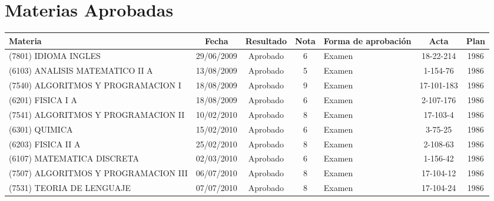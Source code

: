 
\chapter{Materias Aprobadas} %

\label{AppendixB} %


\begin{center}
    \scriptsize
    \centering
    \begin{longtable}{|p{3.5cm}|c|c|c|p{1.4cm}|c|c|}
        \hline 
        \bfseries Materia & \bfseries Fecha & \bfseries Resultado & 
        \bfseries Nota & \bfseries Forma de aprobación & \bfseries Acta & 
        \bfseries	Plan \\
        \hline
        (7801) IDIOMA INGLES & 29/06/2009 & Aprobado & 6 & Examen & 
        18-22-214 & 1986 \\
        \hline
        (6103) ANALISIS MATEMATICO II A & 13/08/2009 & Aprobado & 5 & Examen
        & 1-154-76 & 1986 \\
        \hline
        (7540) ALGORITMOS Y PROGRAMACION I & 18/08/2009 & Aprobado & 9 & 
        Examen & 17-101-183 & 1986 \\
        \hline
        (6201) FISICA I A & 18/08/2009 & Aprobado & 6 & Examen & 2-107-176 &
        1986 \\
        \hline
        (7541) ALGORITMOS Y PROGRAMACION II & 10/02/2010 & Aprobado & 8 & 
        Examen & 17-103-4 & 1986 \\
        \hline
        (6301) QUIMICA & 15/02/2010 & Aprobado & 6 & Examen & 3-75-25 & 1986
        \\
        \hline
        (6203) FISICA II A & 25/02/2010 & Aprobado & 8 & Examen & 2-108-63 &
        1986 \\
        \hline
        (6107) MATEMATICA DISCRETA & 02/03/2010 & Aprobado & 6 & Examen & 
        1-156-42 & 1986 \\
        \hline
        (7507) ALGORITMOS Y PROGRAMACION III & 06/07/2010 & Aprobado & 8 & 
        Examen & 17-104-12 & 1986 \\
        \hline
        (7531) TEORIA DE LENGUAJE & 07/07/2010 & Aprobado & 8 & Examen & 
        17-104-24 & 1986 \\

\end{longtable}
\end{center}
